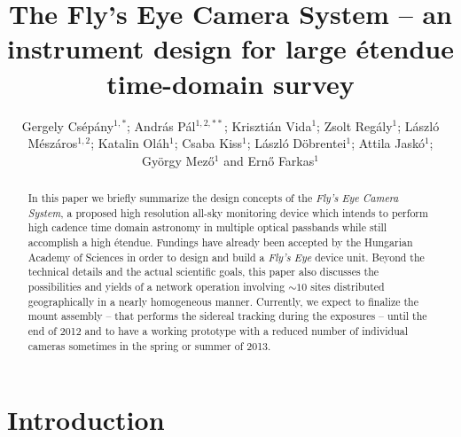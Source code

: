\documentclass[11pt,twoside]{article}
\begin{document}
\title{The Fly's Eye Camera System -- an instrument design for large \'etendue time-domain survey}
\author{%
Gergely Cs\'ep\'any$^{1,*}$;
Andr\'as P\'al$^{1,2,**}$;
Kriszti\'an Vida$^{1}$;
Zsolt Reg\'aly$^{1}$;
L\'aszl\'o M\'esz\'aros$^{1,2}$;
Katalin Ol\'ah$^{1}$;
Csaba Kiss$^{1}$;
L\'aszl\'o D\"obrentei$^{1}$;
Attila Jask\'o$^{1}$;
Gy\"orgy Mez\H{o}$^{1}$ and
Ern\H{o} Farkas$^{1}$
}

\begin{abstract}
In this paper we briefly summarize the design concepts of the 
{\it Fly's Eye Camera System}, 
a proposed high resolution all-sky monitoring
device which intends to perform high cadence time domain astronomy
in multiple optical passbands while
still accomplish a high \'etendue. Fundings have already been accepted
by the Hungarian Academy of Sciences
in order to design and build a {\it Fly's Eye} device unit. Beyond the
technical details and the actual scientific goals, this paper
also discusses the possibilities and yields of a network operation
involving $\sim10$ sites distributed geographically in 
a nearly homogeneous manner. Currently, we expect 
to finalize the mount assembly -- that performs the sidereal tracking
during the exposures -- until the end of 2012 and to 
have a working prototype with a reduced number of individual cameras
sometimes in the spring or summer of 2013.
\end{abstract}

\section{Introduction}
\end{document}
